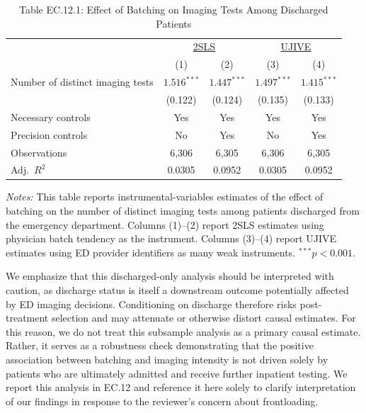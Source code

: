 \documentclass[11pt]{article}
\newcommand{\1}{\hbox{\rm 1\kern-.35em 1}}
\begin{document}
\begin{table}[t!]
\centering
\caption*{Table EC.12.1: Effect of Batching on Imaging Tests Among Discharged Patients}
\label{tab:imaging_discharged}
\begin{threeparttable}
\begin{tabular}{lcccc}
\toprule
& \multicolumn{2}{c}{\underline{2SLS}} & \multicolumn{2}{c}{\underline{UJIVE}} \\
& (1) & (2) & (3) & (4) \\
\midrule

Number of distinct imaging tests
& $1.516^{***}$ & $1.447^{***}$
& $1.497^{***}$ & $1.415^{***}$ \\
& (0.122) & (0.124)
& (0.135) & (0.133) \\[0.75em]

\midrule
Necessary controls & Yes & Yes & Yes & Yes \\
Precision controls & No & Yes & No & Yes \\
Observations 
& 6{,}306 
& 6{,}305 
& 6{,}306 
& 6{,}305 \\
Adj.\ $R^2$
& 0.0305 
& 0.0952 
& 0.0305 
& 0.0952 \\
\bottomrule
\end{tabular}

\begin{flushleft}
\footnotesize
\textit{Notes:} This table reports instrumental-variables estimates of the effect of batching on the number of distinct imaging tests among patients discharged from the emergency department. 
Columns (1)–(2) report 2SLS estimates using physician batch tendency as the instrument. 
Columns (3)–(4) report UJIVE estimates using ED provider identifiers as many weak instruments. 
$^{***} p < 0.001$.
\end{flushleft}

\end{threeparttable}
\end{table}

We emphasize that this discharged-only analysis should be interpreted with caution, as discharge status is itself a downstream outcome potentially affected by ED imaging decisions. Conditioning on discharge therefore risks post-treatment selection and may attenuate or otherwise distort causal estimates. For this reason, we do not treat this subsample analysis as a primary causal estimate. Rather, it serves as a robustness check demonstrating that the positive association between batching and imaging intensity is not driven solely by patients who are ultimately admitted and receive further inpatient testing. We report this analysis in EC.12 and reference it here solely to clarify interpretation of our findings in response to the reviewer’s concern about frontloading.
\end{document}
